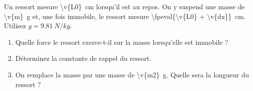 Un ressort mesure \qty{\v{L0}}{cm} lorsqu'il est au repos. On y suspend une masse de \qty{\v{m}}{g} et, une fois immobile, le ressort mesure \qty{\fpeval{\v{L0} + \v{dx}}}{cm}. Utilisez $g = \qty{9.81}{N/kg}$.

\begin{enumerate}[label=\alph*)]
    \item Quelle force le ressort exerce-t-il sur la masse lorsqu'elle est immobile ?
    \item Déterminez la constante de rappel du ressort.
    \item On remplace la masse par une masse de \qty{\v{m2}}{g}. Quelle sera la longueur du ressort ?
\end{enumerate}
